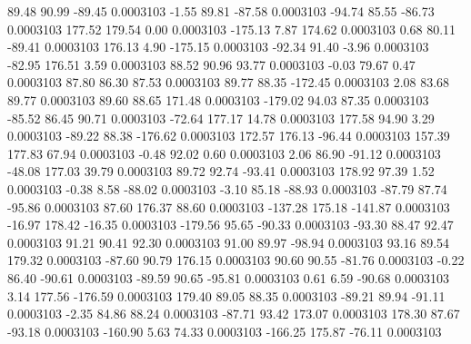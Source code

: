        89.48       90.99      -89.45     0.0003103
       -1.55       89.81      -87.58     0.0003103
      -94.74       85.55      -86.73     0.0003103
      177.52      179.54        0.00     0.0003103
     -175.13        7.87      174.62     0.0003103
        0.68       80.11      -89.41     0.0003103
      176.13        4.90     -175.15     0.0003103
      -92.34       91.40       -3.96     0.0003103
      -82.95      176.51        3.59     0.0003103
       88.52       90.96       93.77     0.0003103
       -0.03       79.67        0.47     0.0003103
       87.80       86.30       87.53     0.0003103
       89.77       88.35     -172.45     0.0003103
        2.08       83.68       89.77     0.0003103
       89.60       88.65      171.48     0.0003103
     -179.02       94.03       87.35     0.0003103
      -85.52       86.45       90.71     0.0003103
      -72.64      177.17       14.78     0.0003103
      177.58       94.90        3.29     0.0003103
      -89.22       88.38     -176.62     0.0003103
      172.57      176.13      -96.44     0.0003103
      157.39      177.83       67.94     0.0003103
       -0.48       92.02        0.60     0.0003103
        2.06       86.90      -91.12     0.0003103
      -48.08      177.03       39.79     0.0003103
       89.72       92.74      -93.41     0.0003103
      178.92       97.39        1.52     0.0003103
       -0.38        8.58      -88.02     0.0003103
       -3.10       85.18      -88.93     0.0003103
      -87.79       87.74      -95.86     0.0003103
       87.60      176.37       88.60     0.0003103
     -137.28      175.18     -141.87     0.0003103
      -16.97      178.42      -16.35     0.0003103
     -179.56       95.65      -90.33     0.0003103
      -93.30       88.47       92.47     0.0003103
       91.21       90.41       92.30     0.0003103
       91.00       89.97      -98.94     0.0003103
       93.16       89.54      179.32     0.0003103
      -87.60       90.79      176.15     0.0003103
       90.60       90.55      -81.76     0.0003103
       -0.22       86.40      -90.61     0.0003103
      -89.59       90.65      -95.81     0.0003103
        0.61        6.59      -90.68     0.0003103
        3.14      177.56     -176.59     0.0003103
      179.40       89.05       88.35     0.0003103
      -89.21       89.94      -91.11     0.0003103
       -2.35       84.86       88.24     0.0003103
      -87.71       93.42      173.07     0.0003103
      178.30       87.67      -93.18     0.0003103
     -160.90        5.63       74.33     0.0003103
     -166.25      175.87      -76.11     0.0003103
